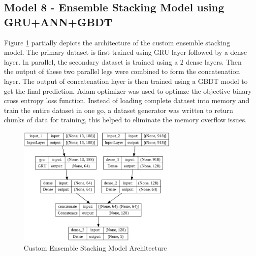 \documentclass[twoside,11pt,a4paper]{article}
\begin{document}
\subsection{Model 8 - Ensemble Stacking Model using \acs{GRU}+\acs{ANN}+\acs{GBDT}}
Figure \ref{fig:gru_nn_gbdt_arch} partially depicts the architecture of the custom ensemble stacking model. The primary dataset is first trained using \acs{GRU} layer followed by a dense layer. In parallel, the secondary dataset is trained using a 2 dense layers. Then the output of these two parallel legs were combined to form the concatenation layer. The output of concatenation layer is then trained using a  \acs{GBDT} model to get the final prediction. Adam optimizer was used to optimze the objective binary cross entropy loss function. Instead of loading complete dataset into memory and train the entire dataset in one go, a dataset generator was written to return chunks of data for training, this helped to eliminate the memory overflow issues.\\
\begin{figure}[ht]
	\centering
	\includegraphics[width=0.7\textwidth, height=0.3\textheight]{GRU_NN_GBDT_Architecture}
	\caption[Custom Ensemble Stacking Model Architecture]{Custom Ensemble Stacking Model Architecture}
	\label{fig:gru_nn_gbdt_arch}
\end{figure}
\end{document}
